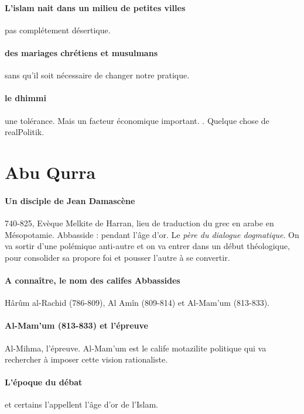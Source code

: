 \paragraph{L'islam nait dans un milieu de petites villes} pas complétement désertique.


\paragraph{des mariages chrétiens et musulmans} sans qu'il soit nécessaire de changer notre pratique. 


\paragraph{le dhimmi} une tolérance. Mais un facteur économique important. . Quelque chose de realPolitik. 



\section{Abu Qurra}


\paragraph{Un disciple de Jean Damascène} 740-825, Evèque Melkite de Harran, lieu de traduction du grec en arabe en Mésopotamie. Abbasside : pendant l'âge d'or.  Le \textit{père du dialogue dogmatique}. On va sortir d'une polémique anti-autre et on va entrer dans un début théologique, pour consolider sa propore foi et pousser l'autre à se convertir. 

\paragraph{A connaître, le nom des califes Abbassides} Hârûm al-Rachid (786-809), Al Amîn (809-814) et Al-Mam'um (813-833). 

\paragraph{Al-Mam'um (813-833) et l'épreuve} Al-Mihma, l'épreuve. Al-Mam'um est le calife motazilite politique qui va rechercher à imposer cette vision rationaliste.

\paragraph{L'époque du débat} et certains l'appellent l'âge d'or de l'Islam. 


